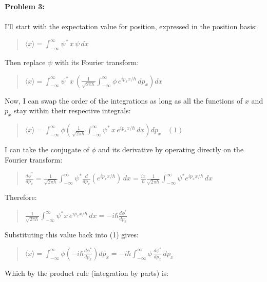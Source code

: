 \documentclass{article}
\begin{document}
\pagebreak
{\bf Problem 3:}
\\\\
I'll start with the expectation value for position, expressed in the
position basis:
\begin{quote}
$
    \langle x \rangle =
    \int_{-\infty}^{\infty} \psi^*\, x\, \psi\, dx
$
\end{quote}
Then replace $\psi$ with its Fourier transform:
\begin{quote}
$
    \langle x \rangle =
    \int_{-\infty}^{\infty} \psi^* \, x\,
    \left(\frac{1}{\sqrt{2\pi\hbar}}
    \int_{-\infty}^{\infty}\phi\, e^{i p_x x/\hbar}\,dp_x\right)
    dx
$
\end{quote}
Now, I can swap the order of the integrations as long as all the
functions of $x$ and $p_x$ stay within their respective integrals:
\begin{quote}
$
    \langle x \rangle =
    \int_{-\infty}^{\infty} \phi
    \left(\frac{1}{\sqrt{2\pi\hbar}}
    \int_{-\infty}^{\infty} \psi^*\,x\,e^{i p_x x/\hbar}\,dx\right)
    dp_x
    \;\;\; (1)
$
\end{quote}
I can take the conjugate of $\phi$ and its derivative by operating
directly on the Fourier transform:
\begin{quote}
$
    \frac{d\phi^*}{dp_x} =
    \frac{1}{\sqrt{2\pi\hbar}} \int_{-\infty}^{\infty} 
    \psi^* \frac{d}{dp_x}\left(e^{i p_x x/\hbar}\right)\,dx
    = \frac{ix}{\hbar}\frac{1}{\sqrt{2\pi\hbar}} \int_{-\infty}^{\infty} 
    \psi^* e^{i p_x x/\hbar}\,dx
$
\end{quote}
Therefore:
\begin{quote}
$
  \frac{1}{\sqrt{2\pi\hbar}} \int_{-\infty}^{\infty} 
    \psi^* x\,e^{i p_x x/\hbar}\,dx
   = -i\hbar\frac{d\phi^*}{dp_x}
$
\end{quote}
Substituting this value back into (1) gives:
\begin{quote}
$
    \langle x \rangle =
    \int_{-\infty}^{\infty}\phi\left( -i\hbar\frac{d\phi^*}{dp_x}\right) dp_x
    = -i\hbar\int_{-\infty}^{\infty}\phi\,\frac{d\phi^*}{dp_x}\,dp_x
$
\end{quote}
Which by the product rule (integration by parts) is:
\end{document}

